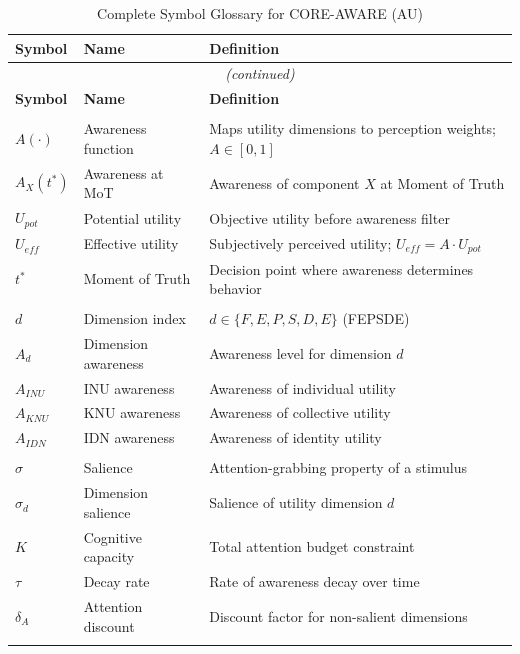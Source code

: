 \begin{longtable}{p{2.5cm}p{4cm}p{7cm}}
\caption{Complete Symbol Glossary for CORE-AWARE (AU)} \\
\toprule
\textbf{Symbol} & \textbf{Name} & \textbf{Definition} \\
\midrule
\endfirsthead
\multicolumn{3}{c}{\textit{(continued)}} \\
\toprule
\textbf{Symbol} & \textbf{Name} & \textbf{Definition} \\
\midrule
\endhead
\bottomrule
\endfoot

\multicolumn{3}{l}{\textit{\textbf{Core Variables}}} \\
$A(\cdot)$ & Awareness function & Maps utility dimensions to perception weights; $A \in [0,1]$ \\
$A_X(t^*)$ & Awareness at MoT & Awareness of component $X$ at Moment of Truth \\
$U_{pot}$ & Potential utility & Objective utility before awareness filter \\
$U_{eff}$ & Effective utility & Subjectively perceived utility; $U_{eff} = A \cdot U_{pot}$ \\
$t^*$ & Moment of Truth & Decision point where awareness determines behavior \\
\addlinespace

\multicolumn{3}{l}{\textit{\textbf{Utility Dimensions}}} \\
$d$ & Dimension index & $d \in \{F, E, P, S, D, E\}$ (FEPSDE) \\
$A_d$ & Dimension awareness & Awareness level for dimension $d$ \\
$A_{INU}$ & INU awareness & Awareness of individual utility \\
$A_{KNU}$ & KNU awareness & Awareness of collective utility \\
$A_{IDN}$ & IDN awareness & Awareness of identity utility \\
\addlinespace

\multicolumn{3}{l}{\textit{\textbf{Determinants}}} \\
$\sigma$ & Salience & Attention-grabbing property of a stimulus \\
$\sigma_d$ & Dimension salience & Salience of utility dimension $d$ \\
$K$ & Cognitive capacity & Total attention budget constraint \\
$\tau$ & Decay rate & Rate of awareness decay over time \\
$\delta_A$ & Attention discount & Discount factor for non-salient dimensions \\
\addlinespace


\end{longtable}
